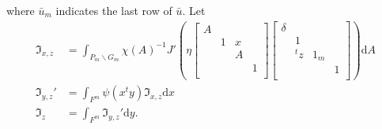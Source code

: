 \documentclass[11pt]{amsart}
\newcommand\If{\mathfrak{I}}
\newcommand\dr{\mathrm{d}}
\newcommand\1{\mathbf{1}}
\newcommand\bs{\backslash}%
\newcommand\bu{\bar{u}}
\numberwithin{equation}{section}
\begin{document}
where $\bu_m$ indicates the last row of $\bu$.
Let
\begin{align*}
\If_{x,z} &= \int_{P_m \bs G_m} \chi(A)^{-1} J'(\eta \begin{bmatrix}
A & & &  \\
& 1 & x & \\
&  &A  &  \\
& & &1  \\
\end{bmatrix}
\begin{bmatrix}
\delta & & &  \\
& 1& & \\
& {}^tz  &1_m &  \\
& &  &1  \\
\end{bmatrix}) \dr A \\
\If_{y,z}' &= \int_{F^m} \psi(x{}^ty) \If_{x,z} \dr x  \\ 
\If_z &= \int_{F^m} \If_{y,z}' \dr y.
\end{align*} 
\end{document}
